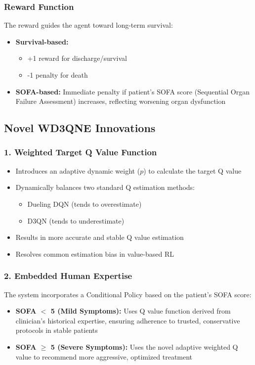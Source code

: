 \subsubsection*{Reward Function}
The reward guides the agent toward long-term survival:
\begin{itemize}
    \item \textbf{Survival-based:} 
    \begin{itemize}
        \item +1 reward for discharge/survival
        \item -1 penalty for death
    \end{itemize}
    \item \textbf{SOFA-based:} Immediate penalty if patient's SOFA score (Sequential Organ Failure Assessment) increases, reflecting worsening organ dysfunction
\end{itemize}

\subsection*{Novel WD3QNE Innovations}

\subsubsection*{1. Weighted Target Q Value Function}
\begin{itemize}
    \item Introduces an adaptive dynamic weight ($p$) to calculate the target Q value
    \item Dynamically balances two standard Q estimation methods:
    \begin{itemize}
        \item Dueling DQN (tends to overestimate)
        \item D3QN (tends to underestimate)
    \end{itemize}
    \item Results in more accurate and stable Q value estimation
    \item Resolves common estimation bias in value-based RL
\end{itemize}

\subsubsection*{2. Embedded Human Expertise}
The system incorporates a Conditional Policy based on the patient's SOFA score:
\begin{itemize}
    \item \textbf{SOFA $<$ 5 (Mild Symptoms):} Uses Q value function derived from clinician's historical expertise, ensuring adherence to trusted, conservative protocols in stable patients
    \item \textbf{SOFA $\geq$ 5 (Severe Symptoms):} Uses the novel adaptive weighted Q value to recommend more aggressive, optimized treatment
\end{itemize}

